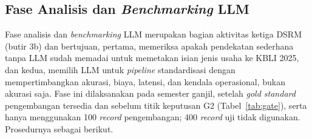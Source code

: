 \subsection{Fase Analisis dan \textit{Benchmarking} LLM}
\label{sec:benchmark}

Fase analisis dan \textit{benchmarking} LLM merupakan bagian aktivitas ketiga DSRM (butir 3b) dan bertujuan, pertama, memeriksa apakah pendekatan sederhana tanpa LLM sudah memadai untuk memetakan isian jenis usaha ke KBLI 2025, dan kedua, memilih LLM untuk \textit{pipeline} standardisasi dengan mempertimbangkan akurasi, biaya, latensi, dan kendala operasional, bukan akurasi saja. Fase ini dilaksanakan pada semester ganjil, setelah \textit{gold standard} pengembangan tersedia dan sebelum titik keputusan G2 (Tabel~\ref{tab:gate}), serta hanya menggunakan 100 \textit{record} pengembangan; 400 \textit{record} uji tidak digunakan. Prosedurnya sebagai berikut.

